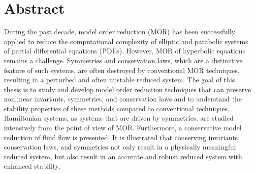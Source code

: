

\cleardoublepage
\chapter*{Abstract}

During the past decade, model order reduction (MOR) has been successfully applied to reduce the computational complexity of elliptic and parabolic systems of partial differential equations (PDEs). However, MOR of hyperbolic equations remains a challenge. Symmetries and conservation laws, which are a distinctive feature of such systems, are often destroyed by conventional MOR techniques, resulting in a perturbed and often unstable reduced system. The goal of this thesis is to study and develop model order reduction techniques that can preserve nonlinear invariants, symmetries, and conservation laws and to understand the stability properties of these methods compared to conventional techniques. Hamiltonian systems, as systems that are driven by symmetries, are studied intensively from the point of view of MOR. Furthermore, a conservative model reduction of fluid flow is presented. It is illustrated that conserving invariants, conservation laws, and symmetries not only result in a physically meaningful reduced system, but also result in an accurate and robust reduced system with enhanced stability.





